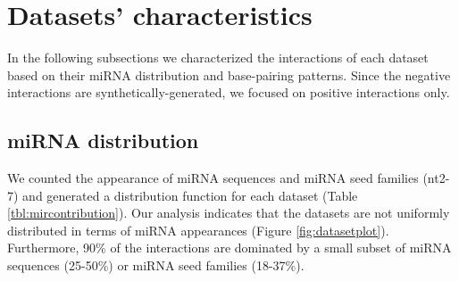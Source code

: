 \section{Datasets' characteristics}
In the following subsections we characterized the interactions of each dataset based on their miRNA distribution and base-pairing patterns. Since the negative interactions are synthetically-generated, we focused on positive interactions only.

\subsection{miRNA distribution}
We counted the appearance of miRNA sequences and miRNA seed families (nt2-7) and generated a distribution function for each dataset (Table \ref{tbl:mircontribution}). Our analysis indicates that the datasets are not uniformly distributed in terms of miRNA appearances (Figure \ref{fig:datasetplot}). Furthermore, 90\% of the interactions are dominated by a small subset of miRNA sequences (25-50\%) or miRNA seed families (18-37\%).



